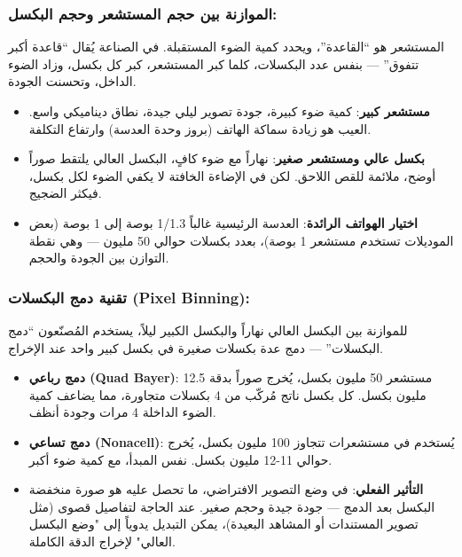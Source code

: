 \subsubsection*{الموازنة بين حجم المستشعر وحجم البكسل:}

المستشعر هو “القاعدة”، ويحدد كمية الضوء المستقبلة. في الصناعة يُقال “قاعدة أكبر تتفوق” — بنفس عدد البكسلات، كلما كبر المستشعر، كبر كل بكسل، وزاد الضوء الداخل، وتحسنت الجودة.

\begin{itemize}
  \item \textbf{مستشعر كبير}: كمية ضوء كبيرة، جودة تصوير ليلي جيدة، نطاق ديناميكي واسع. العيب هو زيادة سماكة الهاتف (بروز وحدة العدسة) وارتفاع التكلفة.
  \item \textbf{بكسل عالي ومستشعر صغير}: نهاراً مع ضوء كافٍ، البكسل العالي يلتقط صوراً أوضح، ملائمة للقص اللاحق. لكن في الإضاءة الخافتة لا يكفي الضوء لكل بكسل، فيكثر الضجيج.
  \item \textbf{اختيار الهواتف الرائدة}: العدسة الرئيسية غالباً 1/1.3 بوصة إلى 1 بوصة (بعض الموديلات تستخدم مستشعر 1 بوصة)، بعدد بكسلات حوالي 50 مليون — وهي نقطة التوازن بين الجودة والحجم.
\end{itemize}

\subsubsection*{تقنية دمج البكسلات (Pixel Binning):}

للموازنة بين البكسل العالي نهاراً والبكسل الكبير ليلاً، يستخدم المُصنّعون “دمج البكسلات” — دمج عدة بكسلات صغيرة في بكسل كبير واحد عند الإخراج.

\begin{itemize}
  \item \textbf{دمج رباعي (Quad Bayer)}: مستشعر 50 مليون بكسل، يُخرج صوراً بدقة 12.5 مليون بكسل. كل بكسل ناتج مُركّب من 4 بكسلات متجاورة، مما يضاعف كمية الضوء الداخلة 4 مرات وجودة أنظف.
  \item \textbf{دمج تساعي (Nonacell)}: يُستخدم في مستشعرات تتجاوز 100 مليون بكسل، يُخرج حوالي 11-12 مليون بكسل. نفس المبدأ، مع كمية ضوء أكبر.
  \item \textbf{التأثير الفعلي}: في وضع التصوير الافتراضي، ما تحصل عليه هو صورة منخفضة البكسل بعد الدمج — جودة جيدة وحجم صغير. عند الحاجة لتفاصيل قصوى (مثل تصوير المستندات أو المشاهد البعيدة)، يمكن التبديل يدوياً إلى "وضع البكسل العالي" لإخراج الدقة الكاملة.
\end{itemize}


